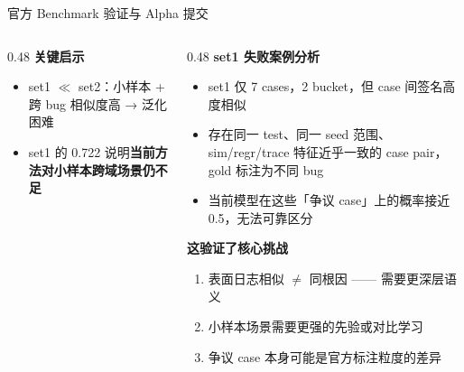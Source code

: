 \documentclass[aspectratio=169,UTF8]{ctexbeamer}
\newcommand{\bad}[1]{\textcolor{ICCADRed}{\textbf{#1}}}
\begin{document}
\begin{frame}{官方 Benchmark 验证与 Alpha 提交}
\begin{columns}[T]
\begin{column}{0.48\textwidth}
      \vspace{3mm}
      \textbf{关键启示}
      \begin{itemize}
        \item set1 $\ll$ set2：小样本 + 跨 bug 相似度高 → 泛化困难
        \item set1 的 0.722 说明\bad{当前方法对小样本跨域场景仍不足}
      \end{itemize}
    \end{column}
    \begin{column}{0.48\textwidth}
      \textbf{set1 失败案例分析}
      \begin{itemize}
        \item set1 仅 7 cases，2 bucket，但 case 间签名高度相似
        \item 存在同一 test、同一 seed 范围、sim/regr/trace 特征近乎一致的 case pair，gold 标注为不同 bug
        \item 当前模型在这些「争议 case」上的概率接近 0.5，无法可靠区分
      \end{itemize}
      \vspace{2mm}
      \textbf{这验证了核心挑战}
      \begin{enumerate}
        \item 表面日志相似 $\neq$ 同根因 —— 需要更深层语义
        \item 小样本场景需要更强的先验或对比学习
        \item 争议 case 本身可能是官方标注粒度的差异
      \end{enumerate}
    \end{column}
  \end{columns}
\end{frame}
\end{document}
